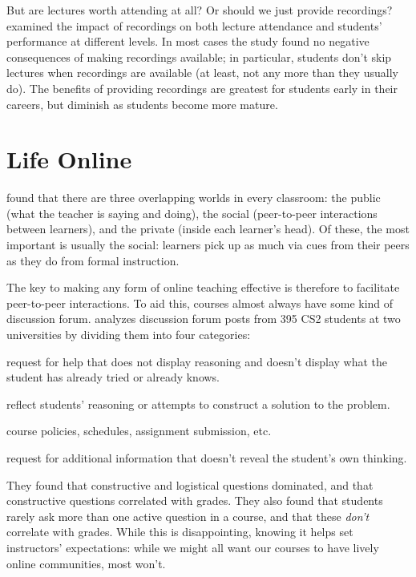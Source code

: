 But are lectures worth attending at all? Or should we just provide
recordings? \cite{Nord2017} examined the impact of recordings on both
lecture attendance and students' performance at different levels. In
most cases the study found no negative consequences of making recordings
available; in particular, students don't skip lectures when recordings
are available (at least, not any more than they usually do). The
benefits of providing recordings are greatest for students early in
their careers, but diminish as students become more mature.

\section{Life Online}\label{s:online-engagement}

\cite{Nuth2007} found that there are three overlapping worlds in
every classroom: the public (what the teacher is saying and doing), the
social (peer-to-peer interactions between learners), and the private
(inside each learner's head). Of these, the most important is usually
the social: learners pick up as much via cues from their peers as they
do from formal instruction.

The key to making any form of online teaching effective is therefore to
facilitate peer-to-peer interactions. To aid this, courses almost always
have some kind of discussion forum. \cite{Vell2017} analyzes
discussion forum posts from 395 CS2 students at two universities by
dividing them into four categories:

\begin{description}
\tightlist
\item[Active:]
request for help that does not display reasoning and doesn't display
what the student has already tried or already knows.
\item[Constructive:]
reflect students' reasoning or attempts to construct a solution to
the problem.
\item[Logistical:]
course policies, schedules, assignment submission, etc.
\item[Content clarification:]
request for additional information that doesn't reveal the student's
own thinking.
\end{description}

They found that constructive and logistical questions dominated, and
that constructive questions correlated with grades. They also found that
students rarely ask more than one active question in a course, and that
these \emph{don't} correlate with grades. While this is disappointing,
knowing it helps set instructors' expectations: while we might all want
our courses to have lively online communities, most won't.

